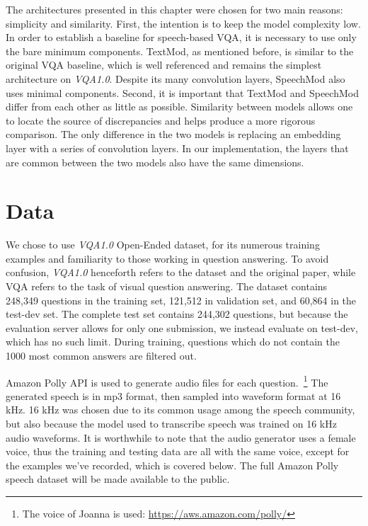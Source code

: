\documentclass[letterpaper]{article} %
\begin{document}
The architectures presented in this chapter were chosen for two main reasons: simplicity and similarity. First, the intention is to keep the model complexity low. In order to establish a baseline for speech-based VQA, it is necessary to use only the bare minimum components. TextMod, as mentioned before, is similar to the original VQA baseline, which is well referenced and remains the simplest architecture on \textit{VQA1.0}. Despite its many convolution layers, SpeechMod also uses minimal components. Second, it is important that TextMod and SpeechMod differ from each other as little as possible. Similarity between models allows one to locate the source of discrepancies and helps produce a more rigorous comparison. The only difference in the two models is replacing an embedding layer with a series of convolution layers. In our implementation, the layers that are common between the two models also have the same dimensions.


\section{Data}
We chose to use \textit{VQA1.0} Open-Ended dataset, for its numerous training examples and familiarity to those working in question answering. To avoid confusion, \textit{VQA1.0} henceforth refers to the dataset and the original paper, while VQA refers to the task of visual question answering. The dataset contains 248,349 questions in the training set, 121,512 in validation set, and 60,864 in the test-dev set. The complete test set contains 244,302 questions, but because the evaluation server allows for only one submission, we instead evaluate on test-dev, which has no such limit. During training, questions which do not contain the 1000 most common answers are filtered out.

Amazon Polly API is used to generate audio files for each question.~\footnote{The voice of Joanna is used: \url{https://aws.amazon.com/polly/}} The generated speech is in mp3 format, then sampled into waveform format at 16 kHz. 16 kHz was chosen due to its common usage among the speech community, but also because the model used to transcribe speech was trained on 16 kHz audio waveforms. It is worthwhile to note that the audio generator uses a female voice, thus the training and testing data are all with the same voice, except for the examples we’ve recorded, which is covered below. The full Amazon Polly speech dataset will be made available to the public.
\end{document}
